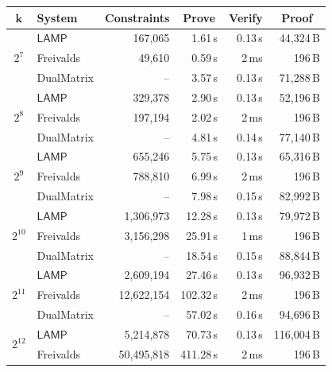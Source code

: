 \documentclass[conference,compsoc]{IEEEtran}
\newif\ifshowrevisions
\newenvironment{revblock}[1][]
  {%
    \ifshowrevisions
      \begin{tcolorbox}[
        breakable,
        colback=revisionyellow,
        colframe=revisionyellow,
        boxrule=0pt,
        arc=0pt,
        left=2pt,
        right=2pt,
        top=2pt,
        bottom=2pt,
        before skip=2pt,
        after skip=2pt,
        #1
      ]
    \fi
  }
  {%
    \ifshowrevisions
      \end{tcolorbox}
    \fi
  }
\newcommand{\protocol}{\textsf{LAMP}}   %
\theoremstyle{plain}
\theoremstyle{definition}
\theoremstyle{remark}
\providecommand{\DIFaddend}{} %
\begin{document}
\DIFaddend \begin{table}[!t]
\centering
\scriptsize
\setlength{\tabcolsep}{1.5pt}
\renewcommand{\arraystretch}{1.05}
\begin{revblock}[unbreakable]
\begin{tabular*}{\linewidth}{@{\extracolsep{\fill}}clrrrr@{}}
\toprule
\(\boldsymbol{k}\) & \textbf{System}
& \multicolumn{1}{c}{\textbf{Constraints}}
& \multicolumn{1}{c}{\textbf{Prove}}
& \multicolumn{1}{c}{\textbf{Verify}}
& \multicolumn{1}{c}{\textbf{Proof}} \\
\midrule
\multirow{3}{*}{$2^7$} & \(\protocol\) & 167{,}065 & 1.61\,s & 0.13\,s & 44{,}324\,B \\
           & Freivalds & 49{,}610 & 0.59\,s & 2\,ms & 196\,B \\
           & DualMatrix & -- & 3.57\,s & 0.13\,s & 71{,}288\,B \\
\midrule
\multirow{3}{*}{$2^8$} & \(\protocol\) & 329{,}378 & 2.90\,s & 0.13\,s & 52{,}196\,B \\
           & Freivalds & 197{,}194 & 2.02\,s & 2\,ms & 196\,B \\
           & DualMatrix & -- & 4.81\,s & 0.14\,s & 77{,}140\,B \\
\midrule
\multirow{3}{*}{$2^9$} & \(\protocol\) & 655{,}246 & 5.75\,s & 0.13\,s & 65{,}316\,B \\
           & Freivalds & 788{,}810 & 6.99\,s & 2\,ms & 196\,B \\
           & DualMatrix & -- & 7.98\,s & 0.15\,s & 82{,}992\,B \\
\midrule
\multirow{3}{*}{$2^{10}$} & \(\protocol\) & 1{,}306{,}973 & 12.28\,s & 0.13\,s & 79{,}972\,B \\
           & Freivalds & 3{,}156{,}298 & 25.91\,s & 1\,ms & 196\,B \\
           & DualMatrix & -- & 18.54\,s & 0.15\,s & 88{,}844\,B \\
\midrule
\multirow{3}{*}{$2^{11}$} & \(\protocol\) & 2{,}609{,}194 & 27.46\,s & 0.13\,s & 96{,}932\,B \\
           & Freivalds & 12{,}622{,}154 & 102.32\,s & 2\,ms & 196\,B \\
           & DualMatrix & -- & 57.02\,s & 0.16\,s & 94{,}696\,B \\
\midrule
\multirow{3}{*}{$2^{12}$} & \(\protocol\) & 5{,}214{,}878 & 70.73\,s & 0.13\,s & 116{,}004\,B \\
           & Freivalds & 50{,}495{,}818 & 411.28\,s & 2\,ms & 196\,B \\

\end{tabular*}
\end{revblock}
\end{table}
\end{document}
